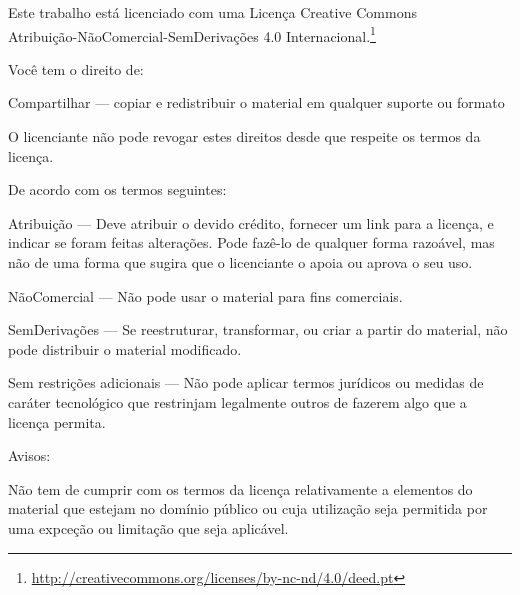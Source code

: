 \cleartorecto
\thispagestyle{plain}
\vspace*{-2.5\baselineskip}%

\enlargethispage{\baselineskip}

{\fontsize{9}{10.5}\selectfont\setlength{\parindent}{0pt}%
\raggedright\label{copyright-details}
\setlength{\parskip}{4.5pt}

{\centering

{\LARGE\ccbyncnd}

\vspace*{0.5\onelineskip}

Este trabalho está licenciado com uma Licença Creative Commons\\
Atribuição-NãoComercial-SemDerivações 4.0 Internacional.\footnote{%
\href{http://creativecommons.org/licenses/by-nc-nd/4.0/deed.pt}{http://creativecommons.org/licenses/by-nc-nd/4.0/deed.pt}}

}

Você tem o direito de:

\begin{packeditemize}
\item Compartilhar — copiar e redistribuir o material em qualquer suporte ou formato
\end{packeditemize}

O licenciante não pode revogar estes direitos desde que respeite os termos da licença.

De acordo com os termos seguintes:

\begin{packeditemize}
\item Atribuição — Deve atribuir o devido crédito, fornecer um link para a licença, e indicar se foram feitas alterações. Pode fazê-lo de qualquer forma razoável, mas não de uma forma que sugira que o licenciante o apoia ou aprova o seu uso.
\item NãoComercial — Não pode usar o material para fins comerciais.
\item SemDerivações — Se reestruturar, transformar, ou criar a partir do material, não pode distribuir o material modificado.
\end{packeditemize}

Sem restrições adicionais — Não pode aplicar termos jurídicos ou medidas de caráter tecnológico que restrinjam legalmente outros de fazerem algo que a licença permita.

Avisos:

Não tem de cumprir com os termos da licença relativamente a elementos do material que estejam no domínio público ou cuja utilização seja permitida por uma expceção ou limitação que seja aplicável.

}
